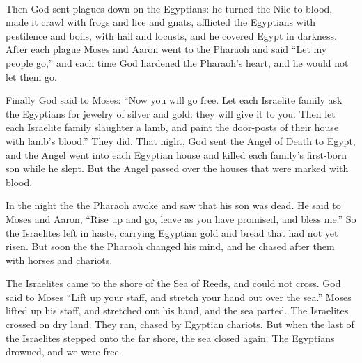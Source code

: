 \documentclass[a4paper,12pt,openany]{memoir}
\newcommand{\HgFill}{\vfill \hrule \vfill}
\newenvironment{HgEnglish}{\strut\\\noindent}{\vspace{1em}}
\begin{document}
\begin{HgEnglish}
  Then God sent plagues down on the Egyptians: 
  he turned the Nile to blood, 
  made it crawl with frogs and lice and gnats, 
  afflicted the Egyptians with pestilence and boils, 
  with hail and locusts, 
  and he covered Egypt in darkness.
  After each plague Moses and Aaron went to the Pharaoh 
  and said ``Let my people go,'' 
  and each time God hardened the Pharaoh's heart, 
  and he would not let them go.

  Finally God said to Moses: 
  ``Now you will go free.
  Let each Israelite family ask the Egyptians
  for jewelry of silver and gold: 
  they will give it to you.
  Then let each Israelite family slaughter a lamb, 
  and paint the door-posts of their house with lamb's blood.'' 
  They did. 
  That night, God sent the Angel of Death to Egypt, 
  and the Angel went into each Egyptian house 
  and killed each family's first-born son while he slept. 
  But the Angel passed over the houses that were marked with blood.

  In the night the the Pharaoh awoke
  and saw that his son was dead. 
  He said to Moses and Aaron,
  ``Rise up and go, leave as you have promised,
  and bless me.''
  So the Israelites left in haste,
  carrying Egyptian gold
  and bread that had not yet risen.
  But soon the the Pharaoh changed his mind, 
  and he chased after them with horses and chariots.

  The Israelites came to the shore of the Sea of Reeds, 
  and could not cross. 
  God said to Moses ``Lift up your staff,
  and stretch your hand out over the sea.'' 
  Moses lifted up his staff, 
  and stretched out his hand,
  and the sea parted. 
  The Israelites crossed on dry land. 
  They ran, chased by Egyptian chariots.
  But when the last of the Israelites stepped onto the far shore, 
  the sea closed again.
  The Egyptians drowned, 
  and we were free.

\end{HgEnglish}

%
\end{document}
